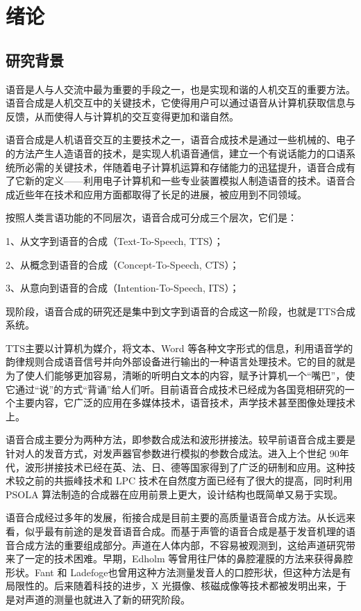 

\chapter{绪论}

\section{研究背景}

语音是人与人交流中最为重要的手段之一，也是实现和谐的人机交互的重要方法。语音合成是人机交互中的关键技术，它使得用户可以通过语音从计算机获取信息与反馈，从而使得人与计算机的交互变得更加和谐自然。


语音合成是人机语音交互的主要技术之一，语音合成技术是通过一些机械的、电子的方法产生人造语音的技术，是实现人机语音通信，建立一个有说话能力的口语系统所必需的关键技术，伴随着电子计算机运算和存储能力的迅猛提升，语音合成有了它新的定义——利用电子计算机和一些专业装置模拟人制造语音的技术。语音合成近些年在技术和应用方面都取得了长足的进展，被应用到不同领域。


按照人类言语功能的不同层次，语音合成可分成三个层次，它们是： 


1、从文字到语音的合成（Text-To-Speech, TTS）； 


2、从概念到语音的合成（Concept-To-Speech, CTS）；


3、从意向到语音的合成（Intention-To-Speech, ITS）； 


现阶段，语音合成的研究还是集中到文字到语音的合成这一阶段，也就是TTS合成系统。


TTS主要以计算机为媒介，将文本、Word 等各种文字形式的信息，利用语音学的韵律规则合成语音信号并向外部设备进行输出的一种语言处理技术。它的目的就是为了使人们能够更加容易，清晰的听明白文本的内容，赋予计算机一个“嘴巴”，使它通过“说”的方式“背诵”给人们听。目前语音合成技术已经成为各国竞相研究的一个主要内容，它广泛的应用在多媒体技术，语音技术，声学技术甚至图像处理技术上。 


语音合成主要分为两种方法，即参数合成法和波形拼接法。较早前语音合成主要是针对人的发音方式，对发声器官参数进行模拟的参数合成法。进入上个世纪 90年代，波形拼接技术已经在英、法、日、德等国家得到了广泛的研制和应用。这种技术较之前的共振峰技术和 LPC 技术在自然度方面已经有了很大的提高，同时利用PSOLA 算法制造的合成器在应用前景上更大，设计结构也既简单又易于实现。


语音合成经过多年的发展，衔接合成是目前主要的高质量语音合成方法。从长远来看，似乎最有前途的是发音语音合成。而基于声管的语音合成是基于发音机理的语音合成方法的重要组成部分。声道在人体内部，不容易被观测到，这给声道研究带来了一定的技术困难。早期，Edholm 等曾用往尸体的鼻腔灌膜的方法来获得鼻腔形状。Fant 和 Ladefoge也曾用这种方法测量发音人的口腔形状，但这种方法是有局限性的。后来随着科技的进步，X 光摄像、核磁成像等技术都被发明出来，于是对声道的测量也就进入了新的研究阶段。


